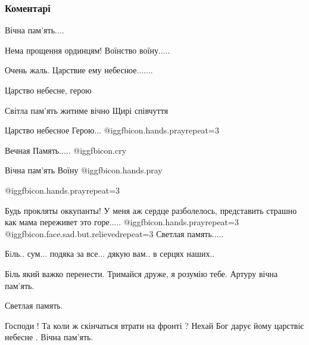  
 
 
 
 
\subsubsection{Коментарі}
\label{sec:12_09_2021.fb.stavickij_nikolaj.1.smert_vojna_golub_artur.cmt}

\begin{itemize} %
Вічна пам'ять....

Нема прощення ординцям! Воїнство воїну.....

Очень жаль. Царствие ему небесное.......

Царство небесне, герою

Світла пам'ять житиме вічно Щирі співчуття

Царство небесное Герою... @igg{fbicon.hands.pray}{repeat=3} 

Вечная Память..... @igg{fbicon.cry} 

Вічна пам'ять Воїну @igg{fbicon.hands.pray} 

 @igg{fbicon.hands.pray}{repeat=3} 


Будь прокляты оккупанты! У меня аж сердце разболелось, представить страшно как
мама переживет это горе..... @igg{fbicon.hands.pray}{repeat=3}  @igg{fbicon.face.sad.but.relieved}{repeat=3}  Светлая память.....

Бiль.. сум... подяка за все... дякую вам.. в серцях наших..


Біль який важко перенести. Тримайся друже, я розумію тебе. Артуру вічна пам'ять.

Светлая память.

Господи ! Та коли ж скінчаться втрати на фронті ?
Нехай Бог дарує йому царствіє небесне .
Вічна пам'ять.


\end{itemize}
